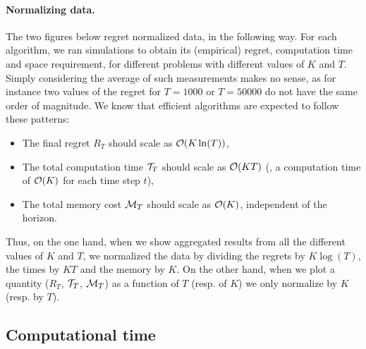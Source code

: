 \paragraph{Normalizing data.}
%
The two figures below regret normalized data, in the following way.
For each algorithm, we ran simulations to obtain its (empirical) regret, computation time and space requirement, for different problems with different values of $K$ and $T$.
Simply considering the average of such measurements makes no sense, as for instance two values of the regret for $T=1000$ or $T=50000$ do not have the same order of magnitude.
%
We know that efficient algorithms are expected to follow these patterns:
\begin{itemize}
    \item The final regret $R_T$ should scale as $\mathcal{O}(K \ln(T))$,
    \item The total computation time $\mathcal{T}_T$ should scale as $\mathcal{O}(K T)$ (\ie, a computation time of $\mathcal{O}(K)$ for each time step $t$),
    \item The total memory cost $\mathcal{M}_T$ should scale as $\mathcal{O}(K)$, independent of the horizon.
\end{itemize}
Thus, on the one hand, when we show aggregated results from all the different values of $K$ and $T$, we normalized the data by dividing the regrets by $K \log(T)$, the times by $K T$ and the memory by $K$.
%
On the other hand, when we plot a quantity ($R_T$, $\mathcal{T}_T$, $\mathcal{M}_T$) as a function of $T$ (resp. of $K$) we only normalize by $K$ (resp. by $T$).


\subsection{Computational time}


